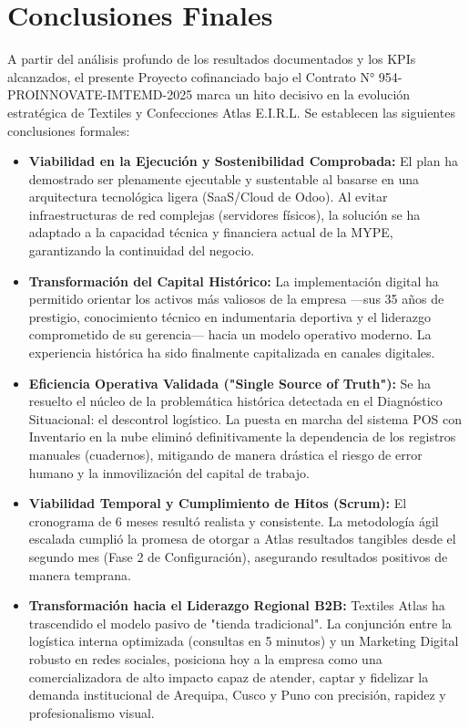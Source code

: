 \section{Conclusiones Finales}

A partir del análisis profundo de los resultados documentados y los KPIs alcanzados, el presente Proyecto cofinanciado bajo el Contrato N° 954-PROINNOVATE-IMTEMD-2025 marca un hito decisivo en la evolución estratégica de Textiles y Confecciones Atlas E.I.R.L. Se establecen las siguientes conclusiones formales:

\begin{itemize}
    \item \textbf{Viabilidad en la Ejecución y Sostenibilidad Comprobada:} El plan ha demostrado ser plenamente ejecutable y sustentable al basarse en una arquitectura tecnológica ligera (SaaS/Cloud de Odoo). Al evitar infraestructuras de red complejas (servidores físicos), la solución se ha adaptado a la capacidad técnica y financiera actual de la MYPE, garantizando la continuidad del negocio.
    
    \item \textbf{Transformación del Capital Histórico:} La implementación digital ha permitido orientar los activos más valiosos de la empresa —sus 35 años de prestigio, conocimiento técnico en indumentaria deportiva y el liderazgo comprometido de su gerencia— hacia un modelo operativo moderno. La experiencia histórica ha sido finalmente capitalizada en canales digitales.
    
    \item \textbf{Eficiencia Operativa Validada ("Single Source of Truth"):} Se ha resuelto el núcleo de la problemática histórica detectada en el Diagnóstico Situacional: el descontrol logístico. La puesta en marcha del sistema POS con Inventario en la nube eliminó definitivamente la dependencia de los registros manuales (cuadernos), mitigando de manera drástica el riesgo de error humano y la inmovilización del capital de trabajo.
    
    \item \textbf{Viabilidad Temporal y Cumplimiento de Hitos (Scrum):} El cronograma de 6 meses resultó realista y consistente. La metodología ágil escalada cumplió la promesa de otorgar a Atlas resultados tangibles desde el segundo mes (Fase 2 de Configuración), asegurando resultados positivos de manera temprana.
    
    \item \textbf{Transformación hacia el Liderazgo Regional B2B:} Textiles Atlas ha trascendido el modelo pasivo de "tienda tradicional". La conjunción entre la logística interna optimizada (consultas en 5 minutos) y un Marketing Digital robusto en redes sociales, posiciona hoy a la empresa como una comercializadora de alto impacto capaz de atender, captar y fidelizar la demanda institucional de Arequipa, Cusco y Puno con precisión, rapidez y profesionalismo visual.
    

\end{itemize}
